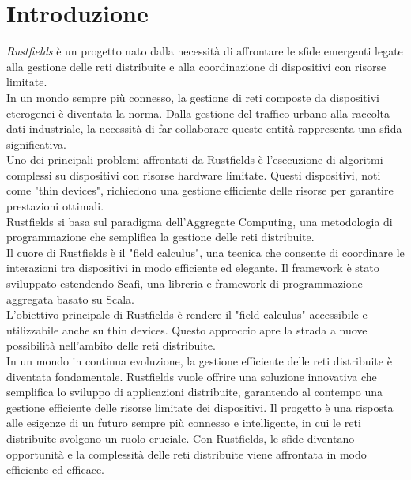 \section{Introduzione}

\textit{Rustfields} è un progetto nato dalla necessità di affrontare le sfide emergenti legate alla gestione delle reti distribuite e alla
coordinazione di dispositivi con risorse limitate. \\

In un mondo sempre più connesso, la gestione di reti composte da dispositivi eterogenei è diventata la norma.
Dalla gestione del traffico urbano alla raccolta dati industriale, la necessità di far collaborare queste entità rappresenta una sfida significativa.\\

Uno dei principali problemi affrontati da Rustfields è l'esecuzione di algoritmi complessi su dispositivi con risorse hardware limitate.
Questi dispositivi, noti come "thin devices", richiedono una gestione efficiente delle risorse per garantire prestazioni ottimali. \\

Rustfields si basa sul paradigma dell'Aggregate Computing, una metodologia di programmazione che semplifica la gestione delle reti distribuite.\\

Il cuore di Rustfields è il "field calculus", una tecnica che consente di coordinare le interazioni tra dispositivi in modo efficiente ed elegante.
Il framework è stato sviluppato estendendo Scafi, una libreria e framework di programmazione aggregata basato su Scala.\\

L'obiettivo principale di Rustfields è rendere il "field calculus" accessibile e utilizzabile anche su thin devices.
Questo approccio apre la strada a nuove possibilità nell'ambito delle reti distribuite.\\

In un mondo in continua evoluzione, la gestione efficiente delle reti distribuite è diventata fondamentale.
Rustfields vuole offrire una soluzione innovativa che semplifica lo sviluppo di applicazioni distribuite, garantendo al contempo una
gestione efficiente delle risorse limitate dei dispositivi. Il progetto è una risposta alle esigenze di un futuro sempre più
connesso e intelligente, in cui le reti distribuite svolgono un ruolo cruciale. Con Rustfields, le sfide diventano opportunità e
la complessità delle reti distribuite viene affrontata in modo efficiente ed efficace.